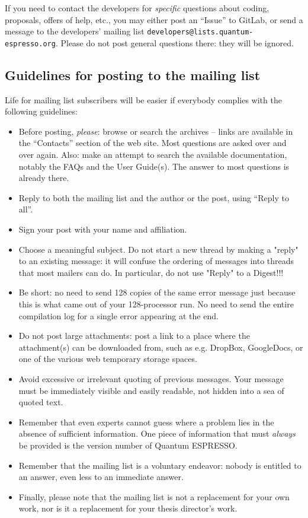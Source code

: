 \documentclass[12pt,a4paper]{article}
\def\qe{{\sc Quantum ESPRESSO}}
\begin{document}
If you need to contact the developers for {\em specific} questions
about coding, proposals, offers of help, etc., you may either post
an ``Issue'' to GitLab, or send a message
to the developers' mailing list \texttt{developers@lists.quantum-espresso.org}.
Please do not post general questions there: they will be ignored.

\subsection{Guidelines for posting to the mailing list}
\label{SubSec:Guidelines}
Life for mailing list subscribers will be easier if everybody
complies with the following guidelines:
\begin{itemize}
\item Before posting, {\em please}: browse or search the archives --
  links are available in the ``Contacts'' section  of the   web site.
  Most questions are asked over and over again. Also: make an attempt
  to search the
  available documentation, notably the FAQs and the User Guide(s).
  The answer to most questions is already there.
\item Reply to both the mailing list and the author or the post, using
  ``Reply to all''.
\item Sign your post with your name and affiliation.
\item Choose a meaningful subject. Do not start a new thread by making
      a	"reply" to an existing message: it will confuse the ordering of
      messages into threads that most mailers can do. In particular, do
      not use "Reply" to a Digest!!!
\item Be short: no need to send 128 copies of the same error message just
  because this is what came out of your 128-processor run. No need to
  send the entire compilation log for a single error appearing at the end.
\item Do not post large attachments: post a link to a place where the
  attachment(s) can be downloaded from, such as e.g. DropBox, GoogleDocs,
  or one of the various web temporary storage spaces.
\item Avoid excessive or irrelevant quoting of previous messages. Your
  message must be immediately visible and easily readable, not hidden
  into a sea of quoted text.
\item Remember that even experts cannot guess where a problem lies in
  the absence of sufficient information. One piece of information that
  must {\em always} be provided is the version number of \qe.
\item Remember that the mailing list is a voluntary endeavor: nobody is
  entitled to an answer, even less to an immediate answer.
\item Finally, please note that the mailing list is not a replacement
  for your own work, nor is it a replacement for your thesis director's
  work.
\end{itemize}
\end{document}
